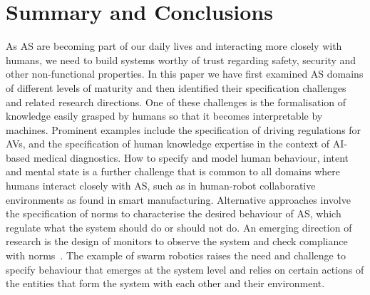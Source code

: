 \documentclass[sigconf,nonacm]{acmart}%
\begin{document}
	
	
	
	
	\section{Summary and Conclusions}\label{conclusions}
	As AS are becoming part of our daily lives and interacting more closely with humans, we need to build systems worthy of trust regarding safety, security and other non-functional properties. In this paper we have first examined AS domains of different levels of maturity and then identified their specification challenges and related research directions. 
	One of these challenges is the formalisation of knowledge easily grasped by humans so that it becomes interpretable by machines. Prominent examples include the specification of driving regulations for AVs, and the specification of human knowledge expertise in the context of AI-based medical diagnostics. 
	How to specify and model human behaviour, intent and mental state is a further challenge that is common to all domains where humans interact closely with AS, such as in human-robot collaborative environments as found in smart manufacturing. 
	Alternative approaches involve the specification of norms to characterise the desired behaviour of AS, which regulate what the system should do or should not do. An emerging direction of research is the design of monitors to observe the system and check compliance with norms~\cite{Criado:2018}. 
	The example of swarm robotics raises the need and challenge to specify behaviour that emerges at the system level and relies on certain actions of the entities that form the system with each other and their environment. 
	
\end{document}
